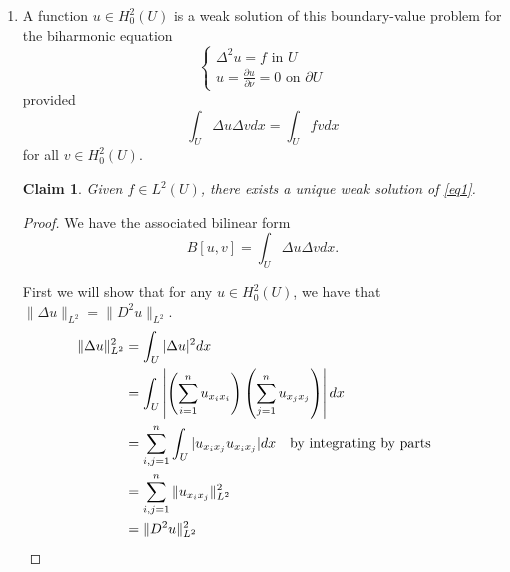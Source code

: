 \documentclass[a4paper]{article}
\newtheorem*{claim}{Claim}
\begin{document}
\begin{enumerate}
\begin{proof}
  Assume that $c(x) \geq - \gamma$ for some $ \gamma >  \frac{C \theta}{2} > 0$. Then
  \begin{align*}
    B[u,u] &= \int_{U}^{} \sum_{i,j=1}^n a^{ij} u_{x_i} u_{x_j} + c u^2 dx \\
    &\geq \theta \int_{U}^{} |Du|^2 + cu^2 dx \\
    &\geq \theta \|Du\|_{L^2(U)}^2 - \frac{C \theta}{2} \int_{U}^{} u^2 dx \\
    &\geq \frac{\theta}{2} \|Du\|_{L^2(U)}^2 + \frac{\theta}{2} \|Du\|_{L^2(U)}^2 - \gamma \|u\|_{L^2(U)}^2 \\
    &\geq \frac{\theta}{2} \|Du\|_{L^2(U)}^2 + \left( \frac{C \theta}{2} - \gamma \right) \|u\|_{L^2(U)}^2 \\
    &\geq C' \|u\|_{H_0^1(U)}
  \end{align*}
  for some $C'>0$ because $\gamma < \frac{C \theta}{2}$. Thus we have coercivity, and $B$ therefore satisfies the hypotheses of the Lax-Milgram Theorem.
\end{proof}

\item
  A function $u \in H_0^2(U)$ is a weak solution of this boundary-value problem for the biharmonic equation
  \begin{equation}\label{eq1}
  \begin{cases}
    \Delta^2 u = f \text{ in } U \\
    u = \frac{\partial u}{\partial \nu} = 0 \text{ on } \partial U
  \end{cases}
\end{equation}
provided
\[ \int_{U}^{} \Delta u \Delta v dx = \int_{U}^{} fv dx \]
for all $v \in H_0^2(U).$
\begin{claim}
  Given $f \in L^2(U)$, there exists a unique weak solution of \eqref{eq1}.
\end{claim}

\begin{proof}

  We have the associated bilinear form
  \[ B[u,v] = \int_{U}^{} \Delta u \Delta v dx .\]

  First we will show that for any $u \in H_0^2(U)$, we have that ${\|\Delta u \|_{L^2} = \| D^2 u \|_{L^2}}$.
  \begin{align*}
    \|\Delta u\|_{L^2}^2 &= \int_{U}^{} |\Delta u|^2 dx \\
    &= \int_{U}^{} \left| \left( \sum_{i=1}^n u_{x_i x_i} \right) \left( \sum_{j=1}^n u_{x_j x_j} \right) \right| dx \\
    &= \sum_{i,j=1}^n \int_{U}^{} | u_{x_i x_j} u_{x_i x_j} | dx \quad \parbox{4cm}{by integrating by parts} \\
    &= \sum_{i,j=1}^n \|u_{x_i x_j}\|_{L^2}^2 \\
    &= \|D^2 u\|_{L^2}^2
  \end{align*}


\end{proof}
\end{enumerate}
\end{document}
